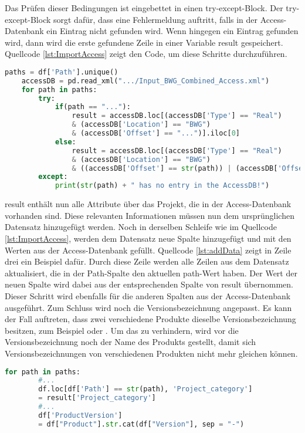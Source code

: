 Das Prüfen dieser Bedingungen ist eingebettet in einen try-except-Block. Der try-except-Block sorgt dafür, dass eine Fehlermeldung auftritt, falls in der Access-Datenbank ein Eintrag nicht gefunden wird.
Wenn hingegen ein Eintrag gefunden wird, dann wird die erste gefundene Zeile in einer Variable \glqq result\grqq{} gespeichert. Quellcode \ref*{lst:ImportAccess} zeigt den Code, um diese Schritte durchzuführen.
\begin{lstlisting}[language = python, caption={Importieren der Access-Datenbank},captionpos=b, label = lst:ImportAccess, floatplacement=H]
    paths = df['Path'].unique()
    accessDB = pd.read_xml(".../Input_BWG_Combined_Access.xml")
    for path in paths:
        try:
            if(path == "..."):
                result = accessDB.loc[(accessDB['Type'] == "Real") 
                & (accessDB['Location'] == "BWG") 
                & (accessDB['Offset'] == "...")].iloc[0]
            else:
                result = accessDB.loc[(accessDB['Type'] == "Real") 
                & (accessDB['Location'] == "BWG") 
                & ((accessDB['Offset'] == str(path)) | (accessDB['Offset'] == (str(path) + "/")))].iloc[0]           
        except:
            print(str(path) + " has no entry in the AccessDB!")
\end{lstlisting}
\glqq result\grqq{} enthält nun alle Attribute über das Projekt, die in der Access-Datenbank vorhanden sind. Diese relevanten Informationen müssen nun dem ursprünglichen 
Datensatz hinzugefügt werden. Noch in derselben Schleife wie im Quellcode \ref*{lst:ImportAccess}, werden dem Datensatz neue Spalte hinzugefügt und mit den Werten aus der 
Access-Datenbank gefüllt. Quellcode \ref*{lst:addData} zeigt in Zeile drei ein Beispiel dafür. Durch diese Zeile werden alle Zeilen aus dem Datensatz aktualisiert, 
die in der \glqq Path\grqq{}-Spalte den aktuellen \glqq path\grqq{}-Wert haben. Der Wert der neuen Spalte wird dabei aus der entsprechenden Spalte von \glqq result\grqq{} übernommen.
Dieser Schritt wird ebenfalls für die anderen Spalten aus der Access-Datenbank ausgeführt. Zum Schluss wird noch die Versionsbezeichnung angepasst. 
Es kann der Fall auftreten, dass zwei verschiedene Produkte dieselbe Versionsbezeichnung besitzen, zum Beispiel \grqq{} oder \grqq{}. Um das zu verhindern,
wird vor die Versionsbezeichnung noch der Name des Produkts gestellt, damit sich Versionsbezeichnungen von verschiedenen Produkten nicht mehr gleichen können.
\begin{lstlisting}[language = python, caption={Erweiterung des Datensatzes},captionpos=b, label = lst:addData, floatplacement=H]
    for path in paths:
        #...
        df.loc[df['Path'] == str(path), 'Project_category']
        = result['Project_category']
        #...
        df['ProductVersion'] 
        = df["Product"].str.cat(df["Version"], sep = "-")
\end{lstlisting}
